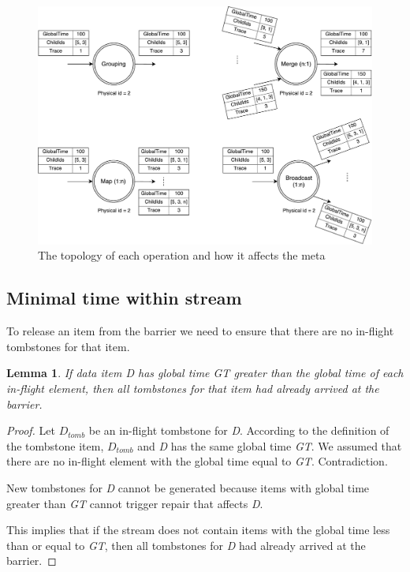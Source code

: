 \begin{figure}[ht]
  \centering
  \includegraphics[width=\linewidth]{pics/operations}
  \caption{The topology of each operation and how it affects the meta}
  \label {logical-graph-ops-figure}
\end{figure}

\label{mininal-time}

\subsection{Minimal time within stream}

To release an item from the barrier we need to ensure that there are no in-flight tombstones for that item. 

\newtheorem{minimal-time-claim}{Lemma}

\begin{minimal-time-claim}
  If data item {\it D} has global time {\it GT} greater than the global time of each in-flight element, then all tombstones for that item had already arrived at the barrier.
\end{minimal-time-claim}

\begin{proof}
  Let $D_{tomb}$ be an in-flight tombstone for {\it D}. According to the definition of the tombstone item, $D_{tomb}$ and {\it D} has the same global time {\it GT}. We assumed that there are no in-flight element with the global time equal to {\it GT}. Contradiction.
  
  New tombstones for {\it D} cannot be generated because items with global time greater than {\it GT} cannot trigger repair that affects {\it D}.

  This implies that if the stream does not contain items with the global time less than or equal to {\it GT}, then all tombstones for {\it D} had already arrived at the barrier. 
\end{proof}

